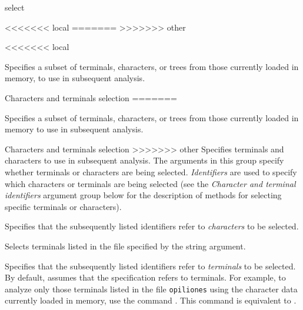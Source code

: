 \begin{command}{select}{}

<<<<<<< local
=======
>>>>>>> other

<<<<<<< local
	\begin{poydescription} 
            Specifies a subset of terminals, characters, or trees from those
            currently loaded in memory, to use in subsequent analysis.
	\end{poydescription}
	

	\begin{arguments}
		
		\begin{argumentgroup}{Characters and terminals selection}
=======
    \begin{poydescription} 
        Specifies a subset of terminals, characters, or trees from those
        currently loaded in memory to use in subsequent analysis.
    \end{poydescription}
    
    \begin{arguments}
        \begin{argumentgroup}{Characters and terminals selection}
>>>>>>> other
            {Specifies terminals and characters to use in subsequent
            analysis. 
            The arguments in this group specify whether terminals or characters
            are being selected.
            \emph{Identifiers} are used to specify which characters or
            terminals are being selected (see
            the \emph{Character and terminal identifiers} argument group below
            for the description of methods for selecting specific terminals or characters).}
 
                {Specifies that the subsequently listed identifiers
                refer to \emph{characters} to be selected.}
                {}

                {Selects terminals listed in the file specified by the string argument.}
                {}

                {Specifies that the subsequently listed identifiers
                refer to \emph{terminals} to be selected. By default, \poy
                assumes that the specification refers to terminals. For example, to
                analyze only those terminals listed in the file \texttt{opiliones} using
                the character data currently loaded in memory, use the command 
                . This  command is
                equivalent to .
                
}
\end{argumentgroup}
\end{arguments}
\end{argumentgroup}
\end{arguments}
\end{command}
